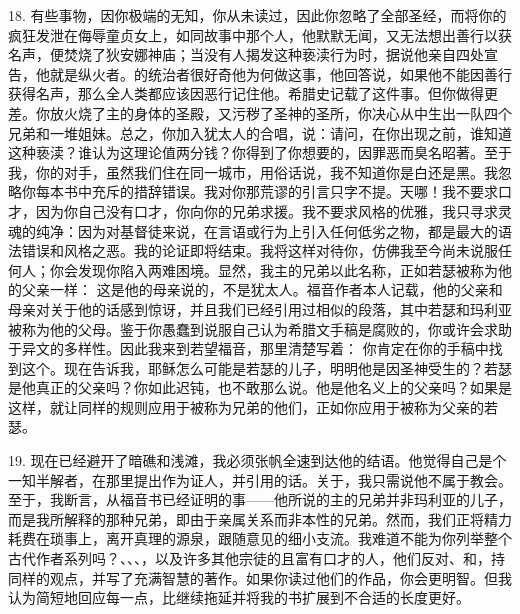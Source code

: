 18. 有些事物，因你极端的无知，你从未读过，因此你忽略了全部圣经，而将你的疯狂发泄在侮辱童贞女上，如同故事中那个人，他默默无闻，又无法想出善行以获名声，便焚烧了狄安娜神庙；当没有人揭发这种亵渎行为时，据说他亲自四处宣告，他就是纵火者。的统治者很好奇他为何做这事，他回答说，如果他不能因善行获得名声，那么全人类都应该因恶行记住他。希腊史记载了这件事。但你做得更差。你放火烧了主的身体的圣殿，又污秽了圣神的圣所，你决心从中生出一队四个兄弟和一堆姐妹。总之，你加入犹太人的合唱，说：请问，在你出现之前，谁知道这种亵渎？谁认为这理论值两分钱？你得到了你想要的，因罪恶而臭名昭著。至于我，你的对手，虽然我们住在同一城市，用俗话说，我不知道你是白还是黑。我忽略你每本书中充斥的措辞错误。我对你那荒谬的引言只字不提。天哪！我不要求口才，因为你自己没有口才，你向你的兄弟求援。我不要求风格的优雅，我只寻求灵魂的纯净：因为对基督徒来说，在言语或行为上引入任何低劣之物，都是最大的语法错误和风格之恶。我的论证即将结束。我将这样对待你，仿佛我至今尚未说服任何人；你会发现你陷入两难困境。显然，我主的兄弟以此名称，正如若瑟被称为他的父亲一样： 这是他的母亲说的，不是犹太人。福音作者本人记载，他的父亲和母亲对关于他的话感到惊讶，并且我们已经引用过相似的段落，其中若瑟和玛利亚被称为他的父母。鉴于你愚蠢到说服自己认为希腊文手稿是腐败的，你或许会求助于异文的多样性。因此我来到若望福音，那里清楚写着： 你肯定在你的手稿中找到这个。现在告诉我，耶稣怎么可能是若瑟的儿子，明明他是因圣神受生的？若瑟是他真正的父亲吗？你如此迟钝，也不敢那么说。他是他名义上的父亲吗？如果是这样，就让同样的规则应用于被称为兄弟的他们，正如你应用于被称为父亲的若瑟。\par

19. 现在已经避开了暗礁和浅滩，我必须张帆全速到达他的结语。他觉得自己是个一知半解者，在那里提出作为证人，并引用的话。关于，我只需说他不属于教会。至于，我断言，从福音书已经证明的事——他所说的主的兄弟并非玛利亚的儿子，而是我所解释的那种兄弟，即由于亲属关系而非本性的兄弟。然而，我们正将精力耗费在琐事上，离开真理的源泉，跟随意见的细小支流。我难道不能为你列举整个古代作者系列吗？、、、，以及许多其他宗徒的且富有口才的人，他们反对、和，持同样的观点，并写了充满智慧的著作。如果你读过他们的作品，你会更明智。但我认为简短地回应每一点，比继续拖延并将我的书扩展到不合适的长度更好。\par

